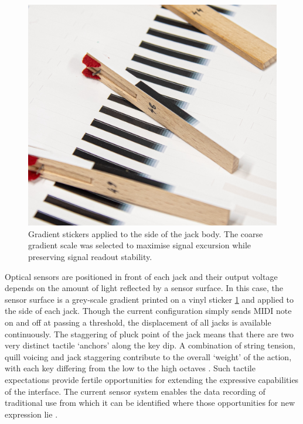 \begin{figure}[!b]  
  \centering
  \includegraphics[width=0.9\linewidth]{src/images/tagging-jacks-3.jpg} 
  \caption{Gradient stickers applied to the side of the jack body. The coarse gradient scale was selected to maximise signal excursion while preserving signal readout stability.}
  \Description{} 
  \label{fig:jack-tags}
\end{figure}

Optical sensors are positioned in front of each jack and their output voltage depends on the amount of light reflected by a sensor surface. In this case, the sensor surface is a grey-scale gradient printed on a vinyl sticker \ref{fig:jack-tags} and applied to the side of each jack. Though the current configuration simply sends MIDI note on and off at passing a threshold, the displacement of all jacks is available continuously.
The staggering of pluck point of the jack means that there are two very distinct tactile `anchors' along the key dip. A combination of string tension, quill voicing and jack staggering contribute to the overall `weight' of the action, with each key differing from the low to the high octaves \cite{Veroli2012}. Such tactile expectations provide fertile opportunities for extending the expressive capabilities of the interface. The current sensor system enables the data recording of traditional use from which it can be identified where those opportunities for new expression lie \cite{McPherson2013-2}.


